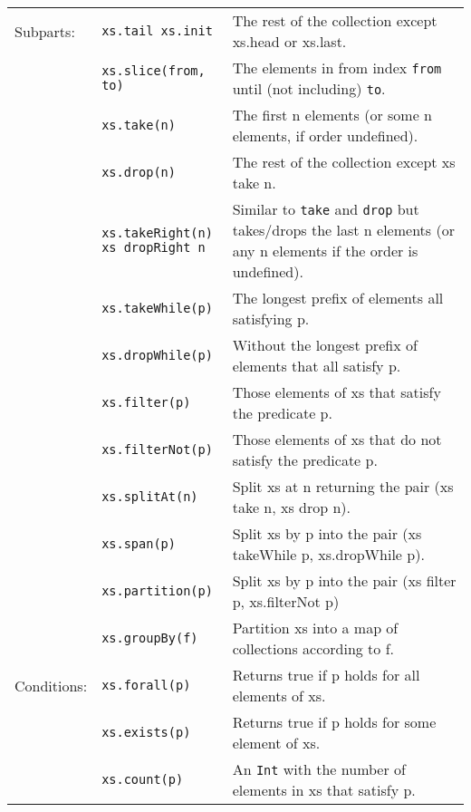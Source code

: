 \documentclass[article, a5paper]{memoir}
\begin{document}
{\begin{tabular}{@{}l p{3.6cm} p{6.8cm}}
  Subparts: & \texttt{xs.tail xs.init} & The rest of the collection except xs.head or xs.last.\\ \cline{2-3}
      & \texttt{xs.slice(from, to)} & The elements in from index \texttt{from} until (not including) \texttt{to}.\\ \cline{2-3}
      & \texttt{xs.take(n)} & The first n elements (or some n elements, if order undefined).\\ \cline{2-3}
      & \texttt{xs.drop(n)} & The rest of the collection except xs take n.\\ \cline{2-3}
      & \texttt{xs.takeRight(n) \newline xs dropRight n} & Similar to \texttt{take} and \texttt{drop}  but takes/drops the last n elements (or any n elements if the order is undefined).\\   \cline{1-3}
      & \texttt{xs.takeWhile(p)} & The longest prefix of elements all satisfying p.\\ \cline{2-3}
      & \texttt{xs.dropWhile(p)} & Without the longest prefix of elements that all satisfy p.\\ \cline{2-3}
      & \texttt{xs.filter(p)} & Those elements of xs that satisfy the predicate p. \\ \cline{2-3}
      & \texttt{xs.filterNot(p)} & Those elements of xs that do not satisfy the predicate p.\\ \cline{2-3}
      & \texttt{xs.splitAt(n)} &  	Split xs at n returning the pair (xs take n, xs drop n).\\ \cline{2-3}
      & \texttt{xs.span(p)} & Split xs by p into the pair (xs takeWhile p, xs.dropWhile p).\\ \cline{2-3}
      & \texttt{xs.partition(p)} & Split xs by p into the pair (xs filter p, xs.filterNot p)\\ \cline{2-3}
      & \texttt{xs.groupBy(f)} & Partition xs into a map of collections according to f.\\ \cline{1-3}


  Conditions: & \texttt{xs.forall(p)} & Returns true if p holds for all elements of xs.\\ \cline{2-3}
      & \texttt{xs.exists(p)} & Returns true if p holds for some element of xs.\\ \cline{2-3}
      & \texttt{xs.count(p)} & An \texttt{Int} with the number of elements in xs that satisfy p.\\ \cline{1-3}


\end{tabular}}
\end{document}
